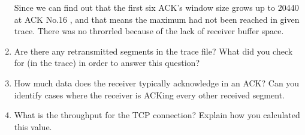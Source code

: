 \begin{enumerate}[label=\bfseries Problem \arabic*:,leftmargin=*,labelindent=1em]
        \vspace{-4mm}
        Since we can find out that the first six ACK’s window size grows up to 20440 at ACK No.16 , and that means the maximum had not been reached in given trace. There was no throrrled because of the lack of receiver buffer space.
        \item Are there any retransmitted segments in the trace file? What did you check for (in the trace) in order to answer this question?\\[0.2mm]
        \soln
        \item How much data does the receiver typically acknowledge in an ACK? Can you identify cases where the receiver is ACKing every other received segment.\\[0.2mm]
        \soln
        \item What is the throughput for the TCP connection? Explain how you calculated this value.\\[0.2mm]
        \soln
    \end{enumerate}
\newpage